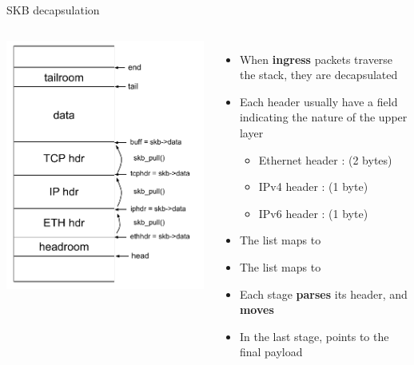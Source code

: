 \begin{frame}{SKB decapsulation}
	\begin{columns}
		\includegraphics[width=1.2\textwidth]{slides/networking-skb/skb_decapsulation.pdf}
		\begin{itemize}
			\item When \textbf{ingress} packets traverse the stack, they are decapsulated
			\item Each header usually have a field indicating the nature of the upper layer
				\begin{itemize}
					\item Ethernet header :  (2 bytes)
					\item IPv4 header :  (1 byte)
					\item IPv6 header :  (1 byte)
				\end{itemize}
			\item The  list maps  to 
			\item The  list maps  to 
			\item Each stage \textbf{parses} its header, and \textbf{moves }
			\item In the last stage,  points to the final payload
		\end{itemize}
	\end{columns}
\end{frame}

